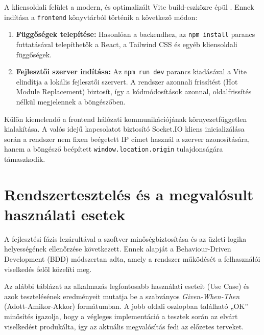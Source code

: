 A kliensoldali felület a modern, és optimalizált Vite build-eszközre épül \cite{vitejs}. Ennek indítása a \texttt{frontend} könyvtárból történik a következő módon:
\begin{enumerate}
    \item \textbf{Függőségek telepítése:} Hasonlóan a backendhez, az \texttt{npm install} parancs futtatásával telepíthetők a React, a Tailwind CSS és egyéb kliensoldali függőségek.
    \item \textbf{Fejlesztői szerver indítása:} Az \texttt{npm run dev} parancs kiadásával a Vite elindítja a lokális fejlesztői szervert. A rendszer azonnali frissítést (Hot Module Replacement) biztosít, így a kódmódosítások azonnal, oldalfrissítés nélkül megjelennek a böngészőben.
\end{enumerate}

Külön kiemelendő a frontend hálózati kommunikációjának környezetfüggetlen kialakítása. A valós idejű kapcsolatot biztosító Socket.IO kliens inicializálása során a rendszer nem fixen beégetett IP címet használ a szerver azonosítására, hanem a böngésző beépített \texttt{window.location.origin} tulajdonságára támaszkodik.

\section{Rendszertesztelés és a megvalósult használati esetek}
\label{sec:testing_use_cases}

A fejlesztési fázis lezárultával a szoftver minőségbiztosítása és az üzleti logika helyességének ellenőrzése következett. Ennek alapját a Behaviour-Driven Development (BDD) módszertan adta, amely a rendszer működését a felhasználói viselkedés felől közelíti meg. 

Az alábbi táblázat az alkalmazás legfontosabb használati eseteit (Use Case) és azok tesztelésének eredményeit mutatja be a szabványos \textit{Given-When-Then} (Adott-Amikor-Akkor) formátumban. A jobb oldali oszlopban található „OK” minősítés igazolja, hogy a végleges implementáció a tesztek során az elvárt viselkedést produkálta, így az aktuális megvalósítás fedi az előzetes terveket.

\vspace{1em}

